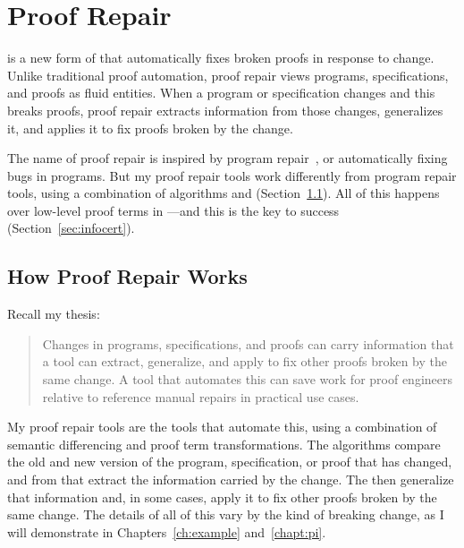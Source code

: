 \section{Proof Repair}
\label{sec:mot-rep}

 is a new form of  that automatically fixes broken proofs in response to change.
Unlike traditional proof automation, proof repair views programs, specifications, and proofs as fluid entities.
When a program or specification changes and this breaks proofs, proof repair extracts information from those
changes, generalizes it, and applies it to fix proofs broken by the change.

The name of proof repair is inspired by program repair~\cite{Monperrus:2018:ASR:3177787.3105906, Gazzola:2018:ASR:3180155.3182526},
or automatically fixing bugs in programs.
But my proof repair tools work differently from program repair tools, 
using a combination of  algorithms and  (Section~\ref{sec:how}).
All of this happens over low-level proof terms in ---and this is the key to success (Section~\ref{sec:infocert}).

\subsection{How Proof Repair Works}
\label{sec:how}

Recall my thesis:

\begin{quote}
Changes in programs, specifications, and proofs can carry information that a tool can extract, generalize, and apply to fix other proofs broken by the same change. A tool that automates this can save work for proof engineers relative to reference manual repairs in practical use cases.
\end{quote}
My proof repair tools are the tools that automate this,
using a combination of semantic differencing and proof term transformations.
The  algorithms compare the old and new version of the program, specification, or proof that has changed,
and from that extract the information carried by the change.
The  then generalize that information and, in some cases, apply it to fix other proofs broken by the same change.
The details of all of this vary by the kind of breaking change,
as I will demonstrate in Chapters~\ref{ch:example} and~\ref{chapt:pi}.


